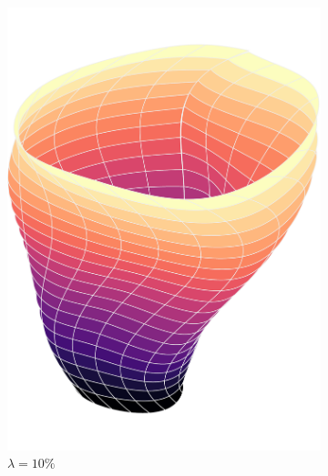 \documentclass[article]{memoir}
\begin{document}
\begin{figure}[htbp]
\begin{subfigure}{0.32\textwidth}
        \includegraphics[width=\linewidth]{../images/surfaces_lambda_10_cropped.pdf}
        \caption{\( \lambda = 10 \% \)}
    \end{subfigure}
    \begin{subfigure}{0.32\textwidth}

\end{subfigure}
\end{figure}
\end{document}

